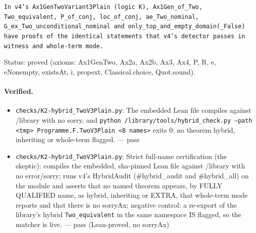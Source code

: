 \documentclass{article}
\begin{document}
\texttt{In v4's Ax1GenTwoVariant3Plain (logic K), Ax1Gen\_of\_Two, Two\_equivalent, P\_of\_conj, loc\_of\_conj, ae\_Two\_nominal, G\_ex\_Two\_unconditional\_nominal and only\_top\_and\_empty\_domain(\_False) have proofs of the identical statements that v4's detector passes in witness and whole-term mode.}

Status: proved (axioms: Ax1GenTwo, Ax2a, Ax2b, Ax3, Ax4, P, R, e, eNonempty, existsAt, i, propext, Classical.choice, Quot.sound).

\paragraph{Verified.}
\begin{itemize}
\item \texttt{checks/K2-hybrid\_TwoV3Plain.py}: The embedded Lean file compiles against /library with no sorry, and \texttt{python /library/tools/hybrid\_check.py --path \textless{}tmp\textgreater{} Programme.F.TwoV3Plain \textless{}8 names\textgreater{}} exits 0: no theorem hybrid, inheriting or whole-term flagged. --- pass
\item \texttt{checks/K2-hybrid\_TwoV3Plain.py}: Strict full-name certification (the skeptic): compiles the embedded, sha-pinned Lean file against /library with no error/sorry; runs v4's HybridAudit (\#hybrid\_audit and \#hybrid\_all) on the module and asserts that no named theorem appears, by FULLY QUALIFIED name, as hybrid, inheriting or EXTRA, that whole-term mode reports and that there is no sorryAx; negative control: a re-export of the library's hybrid \texttt{Two\_equivalent} in the same namespace IS flagged, so the matcher is live. --- pass (Lean-proved, no sorryAx)
\end{itemize}
\end{document}
